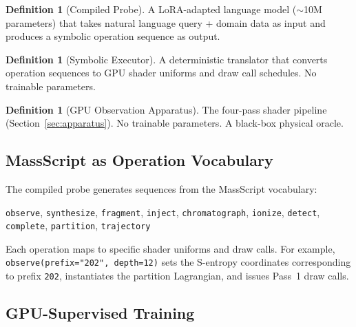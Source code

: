 \documentclass[11pt,twocolumn,a4paper]{article}
\theoremstyle{definition}
\newtheorem{definition}[theorem]{Definition}
\theoremstyle{remark}
\begin{document}
\begin{definition}[Compiled Probe]
A LoRA-adapted language model ($\sim$10M parameters) \citep{hu2022lora} that takes natural language query + domain data as input and produces a symbolic operation sequence as output.
\end{definition}

\begin{definition}[Symbolic Executor]
A deterministic translator that converts operation sequences to GPU shader uniforms and draw call schedules. No trainable parameters.
\end{definition}

\begin{definition}[GPU Observation Apparatus]
The four-pass shader pipeline (Section~\ref{sec:apparatus}). No trainable parameters. A black-box physical oracle.
\end{definition}

\subsection{MassScript as Operation Vocabulary}

The compiled probe generates sequences from the MassScript vocabulary:
\begin{center}
\small
\texttt{observe}, \texttt{synthesize}, \texttt{fragment}, \texttt{inject}, \texttt{chromatograph}, \texttt{ionize}, \texttt{detect}, \texttt{complete}, \texttt{partition}, \texttt{trajectory}
\end{center}
Each operation maps to specific shader uniforms and draw calls. For example, \texttt{observe(prefix="202", depth=12)} sets the S-entropy coordinates corresponding to prefix \texttt{202}, instantiates the partition Lagrangian, and issues Pass~1 draw calls.

\subsection{GPU-Supervised Training}
\end{document}
